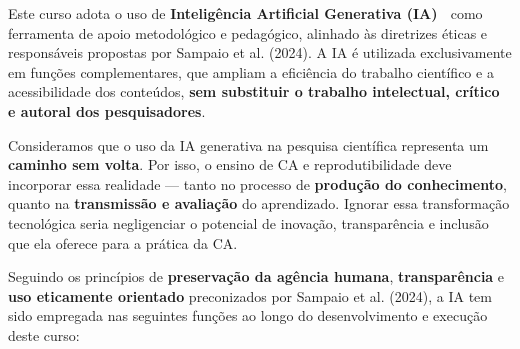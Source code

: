 \documentclass[
  a4paper,
]{book}
\newcommand{\emojitext}[1]{{\emoji #1}}
\begin{document}
Este curso adota o uso de \textbf{Inteligência Artificial Generativa
(IA)} \emojitext{🤖} como ferramenta de apoio metodológico e pedagógico,
alinhado às diretrizes éticas e responsáveis propostas por Sampaio et
al. (2024). A IA é utilizada exclusivamente em funções complementares,
que ampliam a eficiência do trabalho científico e a acessibilidade dos
conteúdos, \textbf{sem substituir o trabalho intelectual, crítico e
autoral dos pesquisadores}.

Consideramos que o uso da IA generativa na pesquisa científica
representa um \textbf{caminho sem volta}. Por isso, o ensino de CA e
reprodutibilidade deve incorporar essa realidade --- tanto no processo
de \textbf{produção do conhecimento}, quanto na \textbf{transmissão e
avaliação} do aprendizado. Ignorar essa transformação tecnológica seria
negligenciar o potencial de inovação, transparência e inclusão que ela
oferece para a prática da CA.

Seguindo os princípios de \textbf{preservação da agência humana},
\textbf{transparência} e \textbf{uso eticamente orientado} preconizados
por Sampaio et al. (2024), a IA tem sido empregada nas seguintes funções
ao longo do desenvolvimento e execução deste curso:
\end{document}
